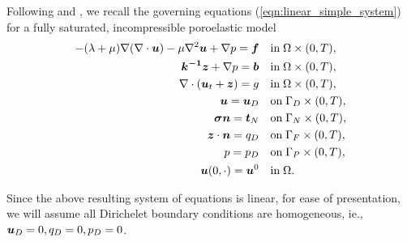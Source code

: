 Following \cite{phillips2007coupling} and \cite{showalter2000diffusion}, we recall the governing equations (\ref{eqn:linear_simple_system}) for a fully saturated, incompressible poroelastic model
\begin{subequations}
\label{strong_cont_system}
\begin{align}
-(\lambda+\mu) \nabla (\nabla\cdot\boldsymbol{u}) - \mu \nabla^{2} \boldsymbol{u} +   \nabla p = \boldsymbol{f} \quad &\mbox{in}\; \Omega\times (0,T),\\
\boldsymbol{k^{-1}} \boldsymbol{z} + \nabla p =  \boldsymbol{b} \quad   &\mbox{in}\; \Omega\times (0,T), \\
 \nabla \cdot ( \boldsymbol{u}_{t} + \boldsymbol{z} )  = g \quad  &\mbox{in}\; \Omega\times (0,T), \\
\boldsymbol{u} = \boldsymbol{u}_{D} \quad & \mbox{on}\; \Gamma_{D}\times (0,T), \\
\boldsymbol{\sigma}\boldsymbol{n} = \boldsymbol{t}_{N} \quad  &\mbox{on}\; \Gamma_{N}\times (0,T), \\
\boldsymbol{z} \cdot \boldsymbol{n} = {q_{D}} \quad  &\mbox{on}\; \Gamma_{F}\times (0,T), \\
p = p_{D}  \quad  &\mbox{on}\; \Gamma_{P}\times (0,T), \\
\boldsymbol{u}(0,\cdot) = \boldsymbol{u}^{0}\quad  &\mbox{in}\;\Omega.
\end{align}
\end{subequations}
\begin{rem}
\label{remark:bdy}
Since the above resulting system of equations is linear, for ease of presentation,  we will assume all Dirichelet boundary conditions are homogeneous, ie., $\mathbf{u}_{D} = {\bf 0}, {q_{D}} = 0, p_{D}=0$.  %
\end{rem}



